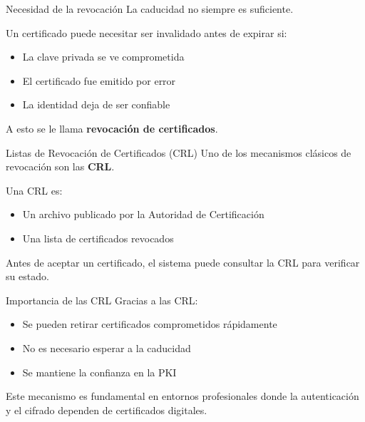 \documentclass{beamer}
\begin{document}
\begin{frame}{Necesidad de la revocación}
La caducidad no siempre es suficiente.

\vspace{0.3cm}
Un certificado puede necesitar ser invalidado antes de expirar si:
\begin{itemize}
    \item La clave privada se ve comprometida
    \item El certificado fue emitido por error
    \item La identidad deja de ser confiable
\end{itemize}

\vspace{0.3cm}
A esto se le llama \textbf{revocación de certificados}.
\end{frame}

\begin{frame}{Listas de Revocación de Certificados (CRL)}
Uno de los mecanismos clásicos de revocación son las \textbf{CRL}.

\vspace{0.3cm}
Una CRL es:
\begin{itemize}
    \item Un archivo publicado por la Autoridad de Certificación
    \item Una lista de certificados revocados
\end{itemize}

\vspace{0.3cm}
Antes de aceptar un certificado, el sistema puede consultar la CRL para verificar su estado.
\end{frame}

\begin{frame}{Importancia de las CRL}
Gracias a las CRL:
\begin{itemize}
    \item Se pueden retirar certificados comprometidos rápidamente
    \item No es necesario esperar a la caducidad
    \item Se mantiene la confianza en la PKI
\end{itemize}

\vspace{0.3cm}
Este mecanismo es fundamental en entornos profesionales donde la autenticación y el cifrado dependen de certificados digitales.
\end{frame}

\end{document}
